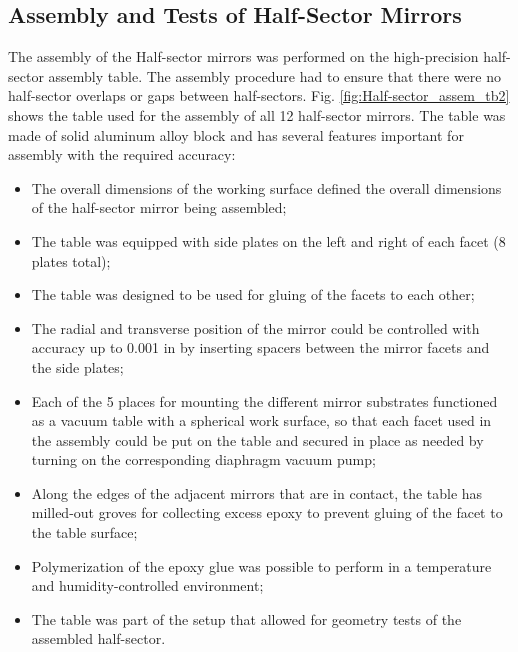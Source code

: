 
\subsection{Assembly and Tests of Half-Sector Mirrors}
The assembly of the Half-sector mirrors was performed on the high-precision half-sector assembly table. The assembly procedure had to ensure that there were no half-sector overlaps or gaps between half-sectors. Fig. \ref{fig:Half-sector_assem_tb2} shows the table used for the assembly of all 12 half-sector mirrors. The table was made of solid aluminum alloy block and has several features important for assembly with the required accuracy:
\begin{itemize}
    \item The overall dimensions of the working surface defined the overall dimensions of the half-sector mirror being assembled;
    \item The table was equipped with side plates on the left and right of each facet (8 plates total);
    \item The table was designed to be used for gluing of the facets to each other;
    \item The radial and transverse position of the mirror could be controlled with accuracy up to 0.001 in by inserting spacers between the mirror facets and the side plates;
    \item Each of the 5 places for mounting the different mirror substrates functioned as a vacuum table with a spherical work surface, so that each  facet used in the assembly could  be put on the table and secured in place as needed by turning on the corresponding  diaphragm vacuum pump;
    \item Along the edges of the adjacent mirrors that are in contact, the table has milled-out groves for collecting excess epoxy to prevent gluing of the facet to the table surface;
    \item Polymerization of the epoxy glue was possible to perform in a temperature and humidity-controlled environment;
    \item The table was part of the setup that allowed for geometry tests of the assembled half-sector.
\end{itemize}

